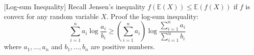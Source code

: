 \item {} [Log-sum Inequality] Recall Jensen's inequality $f(\mathbb{E}(X)) \leq \mathbb{E}(f(X))$ if $f$ is convex for any random variable $X$. Proof the log-sum inequality:
$$ \sum_{i=1}^{n} a_i \log \frac{a_i}{b_i} \geq \left( \sum_{i=1}^{n} a_i\right) \log \frac{\sum_{i=1}^{n} a_i}{\sum_{i=1}^{n} b_i} $$
where $a_1,\ldots,a_n$ and $b_1,\ldots,b_n$ are positive numbers.

\solution






\newpage